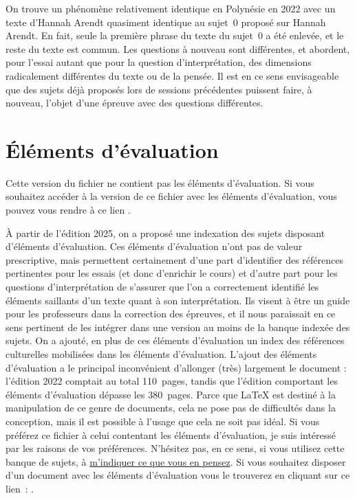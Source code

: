 On trouve un phénomène relativement identique en Polynésie en 2022 avec un texte d'Hannah Arendt quasiment identique au sujet~0 proposé sur Hannah Arendt. En fait, seule la première phrase du texte du sujet~0 a été enlevée, et le reste du texte est commun. Les questions à nouveau sont différentes, et abordent, pour l'essai autant que pour la question d'interprétation, des dimensions radicalement différentes du texte ou de la pensée. Il est en ce sens envisageable que des sujets déjà proposés lors de sessions précédentes puissent faire, à nouveau, l'objet d'une épreuve avec des questions différentes.

\section*{Éléments d'évaluation}

Cette version du fichier ne contient pas les éléments d'évaluation. Si vous souhaitez accéder à la version de ce fichier avec les éléments d'évaluation, vous pouvez vous rendre à ce lien \sujetshlpcorr{}.

À partir de l'édition 2025, on a proposé une indexation des sujets disposant d'éléments d'évaluation. Ces éléments d'évaluation n'ont pas de valeur prescriptive, mais permettent certainement d'une part d'identifier des références pertinentes pour les essais (et donc d'enrichir le cours) et d'autre part pour les questions d'interprétation de s'assurer que l'on a correctement identifié les éléments saillants d'un texte quant à son interprétation. Ils visent à être un guide pour les professeurs dans la correction des épreuves, et il nous paraissait en ce sens pertinent de les intégrer dans une version au moins de la banque indexée des sujets. On a ajouté, en plus de ces éléments d'évaluation un index des références culturelles mobilisées dans les éléments d'évaluation. L'ajout des éléments d'évaluation a le principal inconvénient d'allonger (très) largement le document : l'édition 2022 comptait au total 110~pages, tandis que l'édition comportant les éléments d'évaluation dépasse les 380~pages. Parce que \LaTeX{} est destiné à la manipulation de ce genre de documents, cela ne pose pas de difficultés dans la conception, mais il est possible à l'usage que cela ne soit pas idéal. Si vous préférez ce fichier à celui contentant les éléments d'évaluation, je suis intéressé par les raisons de vos préférences. N'hésitez pas, en ce sens, si vous utilisez cette banque de sujets, à \href{mailto:mikael.quesseveur@ac-lille.fr}{m'indiquer ce que vous en pensez}. Si vous souhaitez disposer d'un document avec les éléments d'évaluation vous le trouverez en cliquant sur ce lien~: \sujetshlpcorr{}.

